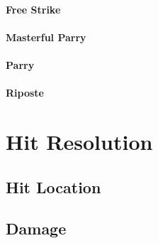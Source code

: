 \paragraph{Free Strike}

\paragraph{Masterful Parry}

\paragraph{Parry}

\paragraph{Riposte}

\section{Hit Resolution}

\subsection{Hit Location}

\subsection{Damage}